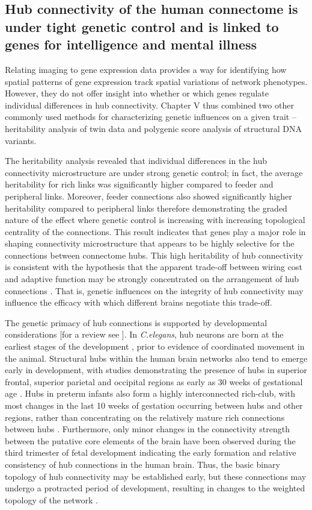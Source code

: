\subsection*{Hub connectivity of the human connectome is under tight genetic control and is linked to genes for intelligence and mental illness}

Relating imaging to gene expression data provides a way for identifying how spatial patterns of gene expression track spatial variations of network phenotypes. However, they do not offer insight into whether or which genes regulate individual differences in hub connectivity. Chapter V thus combined two other commonly used methods for characterizing genetic influences on a given trait -- heritability analysis of twin data and polygenic score analysis of structural DNA variants.

The heritability analysis revealed that individual differences in the hub connectivity microstructure are under strong genetic control; in fact, the average heritability for rich links was significantly higher compared to feeder and peripheral links. Moreover, feeder connections also showed significantly higher heritability compared to peripheral links therefore demonstrating the graded nature of the effect where genetic control is increasing with increasing topological centrality of the connections. This result indicates that genes play a major role in shaping connectivity microstructure that appears to be highly selective for the connections between connectome hubs. This high heritability of hub connectivity is consistent with the hypothesis that the apparent trade-off between wiring cost and adaptive function may be strongly concentrated on the arrangement of hub connections \citep{Bullmore2012}. That is, genetic influences on the integrity of hub connectivity may influence the efficacy with which different brains negotiate this trade-off.

The genetic primacy of hub connections is supported by developmental considerations [for a review see \citep{Oldham2018}]. In \textit{C.elegans}, hub neurons are born at the earliest stages of the development \citep{Varier2011}, prior to evidence of coordinated movement in the animal. Structural hubs within the human brain networks also tend to emerge early in development, with studies demonstrating the presence of hubs in superior frontal, superior parietal and occipital regions as early as 30 weeks of gestational age \citep{Ball2014}. Hubs in preterm infants also form a highly interconnected rich-club, with most changes in the last 10 weeks of gestation occurring between hubs and other regions, rather than concentrating on the relatively mature rich connections between hubs \citep{Ball2014}. Furthermore, only minor changes in the connectivity strength between the putative core elements of the brain have been observed during the third trimester of fetal development \citep{Batalle2017} indicating the early formation and relative consistency of hub connections in the human brain. Thus, the basic binary topology of hub connectivity may be established early, but these connections may undergo a protracted period of development, resulting in changes to the weighted topology of the network \citep{Baker2015a,Oldham2018}.

